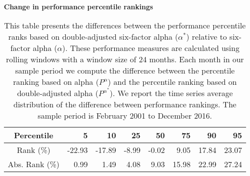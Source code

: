 \newpage
  \begin{singlespacing}
\begin{table}[H]
\small
\centering
\setlength{\tabcolsep}{12.5pt}
{\captionsetup{justification=centering,singlelinecheck=off}
\caption{\bfseries Change in performance percentile rankings} \label{table5} }
\caption*{This table presents the differences between the performance percentile ranks based on double-adjusted six-factor alpha ($\alpha^*$) relative to six-factor alpha ($\alpha$). These performance measures are calculated using rolling windows with a window size of 24 months. Each month in our sample period we compute the difference between the percentile ranking based on alpha ($P^\alpha$) and the percentile ranking based on double-adjusted alpha ($P^{\alpha^*}$). We report the time series average distribution of the difference between performance rankings. The sample period is February 2001 to December 2016.}
{\captionsetup{justification=centering,singlelinecheck=off}}

\label{my-label}
\begin{tabular}{crrrrrrr}
\hline
Percentile     & 5      & 10     & 25    & 50   & 75    & 90    & 95    \\ \hline
Rank (\%)   &  -22.93 & -17.89 &	-8.99 &	-0.02 &	9.05 & 17.84 &	23.07 \\
Abs. Rank (\%) & 0.99 & 	1.49 & 	4.08 &	9.03 &	15.98 & 	22.99 &	27.24\\ \hline
\end{tabular}
\end{table}
\end{singlespacing}

